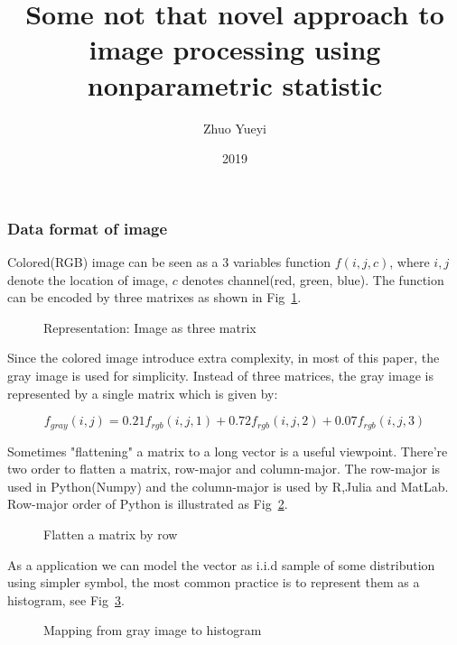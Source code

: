 \documentclass{beamer}
\title[Nonparametric statistic and image processing]{Some not that novel approach to image processing using nonparametric statistic }
\author{Zhuo Yueyi}
\institute[NUST]{Department of Computer Science and Engineering}
\date{2019}
\begin{document}
\frame{\titlepage}

\begin{frame}

    \frametitle{Data format of image}

    Colored(RGB) image can be seen as a 3 variables function  $f(i,j,c)$, where $i,j$ denote the location of image, $c$ denotes
    channel(red, green, blue). The function can be encoded by three matrixes as shown in Fig~\ref{fig:toad_rgb}.

    \begin{figure}[htb]
    \centering
    \scalebox{.75}{}
    \caption{Representation: Image as three matrix}
    \label{fig:toad_rgb}
    \end{figure}


\end{frame}

\begin{frame}

    Since the colored image introduce extra complexity, in most of this paper, the gray image is used for simplicity.
    Instead of three matrices, the gray image is represented by a single matrix which is given by:
    
    \begin{equation}
      f_{gray}(i,j) = 0.21 f_{rgb}(i,j,1) + 0.72 f_{rgb}(i,j,2) + 0.07 f_{rgb}(i,j,3)
      \label{eq:rgb_to_gray}
    \end{equation}
    
    Sometimes "flattening" a matrix to a long vector is a useful viewpoint. There're two order to flatten a matrix,
    row-major and column-major. The row-major is used in Python(Numpy) and the column-major is used by R,Julia and MatLab.
    Row-major order of Python is illustrated as Fig~\ref{fig:flatten_matrix}.
    
    \begin{figure}[htb]
      \centering
      
      \caption{Flatten a matrix by row}
      \label{fig:flatten_matrix}
    \end{figure}
    
\end{frame}

\begin{frame}
    As a application we can model the vector as i.i.d sample of some distribution using simpler symbol, the most 
    common practice is to represent them as a histogram, see Fig~\ref{fig:map_gray_to_hist}. 

    \begin{figure}[htb]
    \centering
    
    \caption{Mapping from gray image to histogram}
    \label{fig:map_gray_to_hist}
    \end{figure}

\end{frame}
\end{document}
